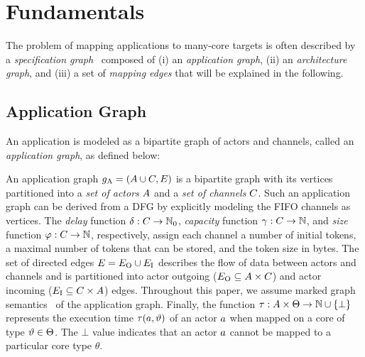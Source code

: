\section{Fundamentals}\label{sec:fundamentals}
The problem of mapping applications to many-core targets is often described by a \emph{specification graph}~\cite{Blickle1998,teichHSWCOUT,Teich:2017} composed of (i) an \emph{application graph}, (ii) an \emph{architecture graph}, and (iii) a set of \emph{mapping edges} that will be explained in the following.
\subsection{Application Graph}\label{sec:application}
An application is modeled as a bipartite graph of actors and channels, called an \emph{application graph}, as defined below:
\begin{definition}\label{def:application}
An application graph $g_\textrm{A} = (A \cup C,E)$ is a bipartite graph with its vertices partitioned into a \emph{set of actors} $A$ and a \emph{set of channels} $C$.
Such an application graph can be derived from a \ac{DFG} by explicitly modeling the \ac{FIFO} channels as vertices.
The \emph{delay} function $\delta: C \to \mathbb{N}_{0}$, \emph{capacity} function $\gamma: C \to \mathbb{N}$, and \emph{size} function $\varphi: C \to \mathbb{N}$, respectively, assign each channel a number of initial tokens, a maximal number of tokens that can be stored, and the token size in bytes.
The set of directed edges $E = E_\textrm{O} \cup E_\textrm{I}$ describes the flow of data between actors and channels and is partitioned into actor outgoing ($E_\textrm{O} \subseteq A \times C$) and actor incoming ($E_\textrm{I} \subseteq C \times A$) edges.
Throughout this paper, we assume marked graph semantics~\cite{chep_1971-marked-graphs} of the application graph.
Finally, the function $\tau: A \times \Theta \rightarrow \mathbb{N} \cup \{\bot\}$ represents the execution time $\tau(a, \vartheta)$ of an actor $a$ when mapped on a core of type $\vartheta \in \Theta$.
The $\bot$ value indicates that an actor $a$ cannot be mapped to a particular core type $\theta$.
\end{definition}
